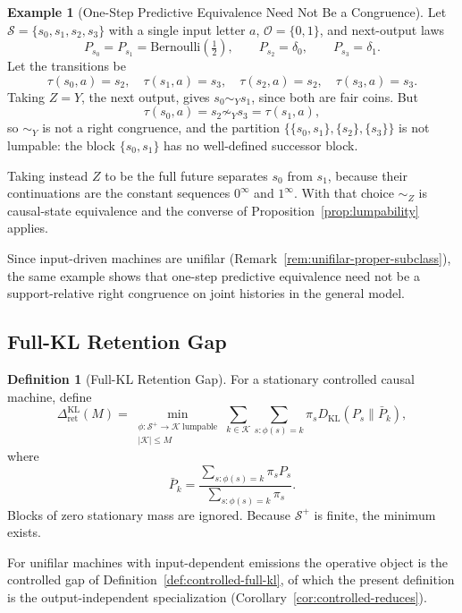 \documentclass[12pt]{article}
\theoremstyle{definition}
\newtheorem{definition}[theorem]{Definition}
\newtheorem{example}[theorem]{Example}
\newcommand{\RetKL}{\Delta_{\mathrm{ret}}^{\mathrm{KL}}}
\newcommand{\Splus}{\mathcal S^{+}}
\begin{document}
\begin{example}[One-Step Predictive Equivalence Need Not Be a Congruence]
\label{ex:onestep-not-congruence}
Let $\mathcal S=\{s_0,s_1,s_2,s_3\}$ with a single input letter $a$,
$\mathcal O=\{0,1\}$, and next-output laws
\[
P_{s_0}=P_{s_1}=\mathrm{Bernoulli}(\tfrac12),
\qquad
P_{s_2}=\delta_0,
\qquad
P_{s_3}=\delta_1 .
\]
Let the transitions be
\[
\tau(s_0,a)=s_2,\quad
\tau(s_1,a)=s_3,\quad
\tau(s_2,a)=s_2,\quad
\tau(s_3,a)=s_3 .
\]
Taking $Z=Y$, the next output, gives $s_0\sim_Ys_1$, since both are fair
coins.  But
\[
\tau(s_0,a)=s_2\not\sim_Y s_3=\tau(s_1,a),
\]
so $\sim_Y$ is not a right congruence, and the partition
$\{\{s_0,s_1\},\{s_2\},\{s_3\}\}$ is not lumpable: the block
$\{s_0,s_1\}$ has no well-defined successor block.

Taking instead $Z$ to be the full future separates $s_0$ from $s_1$, because
their continuations are the constant sequences $0^\infty$ and $1^\infty$.  With
that choice $\sim_Z$ is causal-state equivalence and the converse of
Proposition~\ref{prop:lumpability} applies.

Since input-driven machines are unifilar
(Remark~\ref{rem:unifilar-proper-subclass}), the same example shows that
one-step predictive equivalence need not be a support-relative right
congruence on joint histories in the general model.
\end{example}

\subsection{Full-KL Retention Gap}
\label{subsec:full-kl-gap}

\begin{definition}[Full-KL Retention Gap]
\label{def:full-kl-retention}
For a stationary controlled causal machine, define
\[
\RetKL(M)
=
\min_{\substack{
\phi:\Splus\to\mathcal K\ \text{lumpable}\\
|\mathcal K|\le M
}}
\sum_{k\in\mathcal K}
\sum_{s:\phi(s)=k}
\pi_s
D_{\mathrm{KL}}(P_s\|\bar P_k),
\]
where
\[
\bar P_k
=
\frac{
\sum_{s:\phi(s)=k}\pi_s P_s
}{
\sum_{s:\phi(s)=k}\pi_s
}.
\]
Blocks of zero stationary mass are ignored.  Because $\Splus$ is finite, the
minimum exists.

For unifilar machines with input-dependent emissions the operative object is
the controlled gap of Definition~\ref{def:controlled-full-kl}, of which the
present definition is the output-independent specialization
(Corollary~\ref{cor:controlled-reduces}).
\end{definition}
\end{document}
